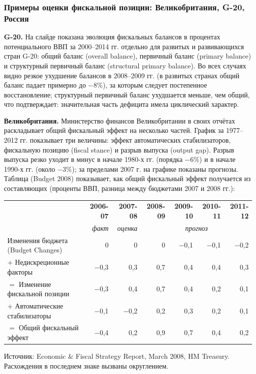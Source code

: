 \documentclass[11pt,a4paper]{article}
\begin{document}
\subsubsection{Примеры оценки фискальной позиции: Великобритания, G-20, Россия}

\textbf{G-20.} На слайде показана эволюция фискальных балансов в процентах потенциального ВВП за 2000--2014 гг. отдельно для развитых и развивающихся стран G-20: общий баланс (overall balance), первичный баланс (primary balance) и структурный первичный баланс (structural primary balance). Во всех случаях видно резкое ухудшение балансов в 2008--2009 гг. (в развитых странах общий баланс падает примерно до $-8$\%), за которым следует постепенное восстановление; структурный первичный баланс ухудшается меньше, чем общий, что подтверждает: значительная часть дефицита имела циклический характер.

\textbf{Великобритания.} Министерство финансов Великобритании в своих отчётах раскладывает общий фискальный эффект на несколько частей. График за 1977--2012 гг. показывает три величины: эффект автоматических стабилизаторов, фискальную позицию (fiscal stance) и разрыв выпуска (output gap). Разрыв выпуска резко уходит в минус в начале 1980-х гг. (порядка $-6$\%) и в начале 1990-х гг. (около $-3$\%); за пределами 2007 г. на графике показаны прогнозы. Таблица (Budget 2008) показывает, как общий фискальный эффект получается из составляющих (проценты ВВП, разница между бюджетами 2007 и 2008 гг.):

\begin{center}
\footnotesize
\setlength{\tabcolsep}{3.5pt}
\begin{tabular}{>{\raggedright\arraybackslash}p{4.9cm}rrrrrr}
\toprule
 & \textbf{2006-07} & \textbf{2007-08} & \textbf{2008-09} & \textbf{2009-10} & \textbf{2010-11} & \textbf{2011-12}\\
 & \textit{факт} & \textit{оценка} & \multicolumn{4}{c}{\textit{прогноз}}\\
\midrule
Изменения бюджета (Budget Changes) & 0 & 0 & 0 & −0,1 & −0,1 & −0,2\\
$+$ Недискреционные факторы & −0,3 & 0,3 & 0,7 & 0,4 & 0,4 & 0,3\\
$=$ Изменение фискальной позиции & −0,3 & 0,4 & 0,7 & 0,4 & 0,2 & 0,1\\
$+$ Автоматические стабилизаторы & −0,1 & −0,2 & 0,2 & 0,3 & 0,2 & 0,1\\
$=$ Общий фискальный эффект & −0,4 & 0,2 & 0,9 & 0,7 & 0,4 & 0,2\\
\bottomrule
\end{tabular}

{\footnotesize Источник: Economic \& Fiscal Strategy Report, March 2008, HM Treasury. Расхождения в последнем знаке вызваны округлением.}
\end{center}
\end{document}
